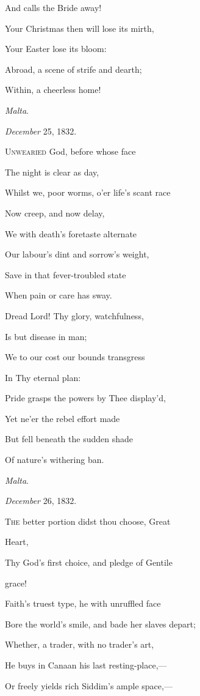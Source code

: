 And calls the Bride away! 

Your Christmas then will lose its mirth,

Your Easter lose its bloom:

Abroad, a scene of strife and dearth;

Within, a cheerless home!

\emph{Malta}.

\emph{December} 25, 1832.


U\textsc{nwearied} God, before whose face

The night is clear as day,

Whilst we, poor worms, o'er life's scant race

Now creep, and now delay,

We with death's foretaste alternate

Our labour's dint and sorrow's weight,

Save in that fever-troubled state

When pain or care has sway.

Dread Lord! Thy glory, watchfulness,

Is but disease in man;

We to our cost our bounds transgress

In Thy eternal plan:

Pride grasps the powers by Thee display'd,

Yet ne'er the rebel effort made

But fell beneath the sudden shade

Of nature's withering ban.

\emph{Malta}.

\emph{December} 26, 1832.


T\textsc{he} better portion didst thou choose, Great

Heart,

Thy God's first choice, and pledge of
Gentile

grace!

Faith's truest type, he with unruffled face

Bore the world's smile, and bade her slaves depart;

Whether, a trader, with no trader's art,

He buys in Canaan his last resting-place,—

Or freely yields rich Siddim's ample space,—

